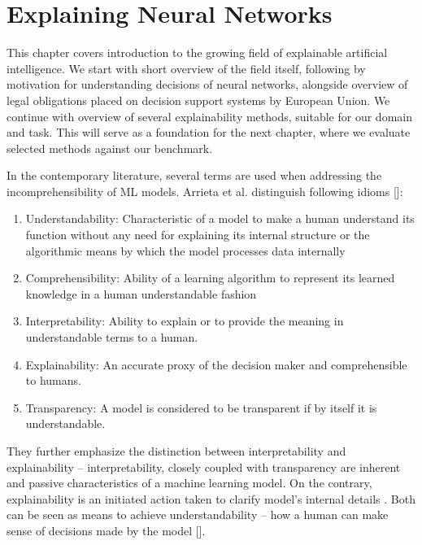 \chapter{Explaining Neural Networks}


This chapter covers introduction to the growing field of explainable artificial intelligence. We start with short overview of the field itself, following by motivation for understanding decisions of neural networks, alongside overview of legal obligations placed on decision support systems by European Union. We continue with overview of several explainability methods, suitable for our domain and task. This will serve as a foundation for the next chapter, where we evaluate selected methods against our benchmark.

In the contemporary literature, several terms are used when addressing the incomprehensibility of ML models. Arrieta et al. distinguish following idioms []:

\begin{enumerate}
    \item Understandability: Characteristic of a model to make a human understand its function without any need for explaining its internal structure or the algorithmic means by which the model processes data internally
    \item Comprehensibility: Ability of a learning algorithm to represent its learned knowledge in a human understandable fashion 
    \item Interpretability: Ability to explain or to provide the meaning in understandable terms to a human.
    \item Explainability: An accurate proxy of the decision maker and comprehensible to humans.
    \item Transparency: A model is considered to be transparent if by itself it is understandable.
\end{enumerate}

They further emphasize the distinction between interpretability and explainability -- interpretability, closely coupled with transparency are inherent and passive characteristics of a machine learning model. On the contrary, explainability is an initiated action taken to clarify model's internal details . Both can be seen as means to achieve understandability -- how a human can make sense of decisions made by the model [].

